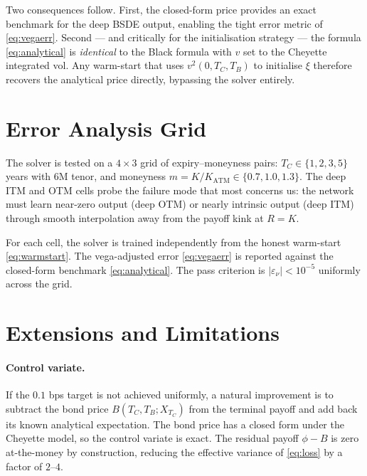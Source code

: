 \documentclass[11pt,a4paper]{article}
\begin{document}
Two consequences follow. First, the closed-form price provides an exact
benchmark for the deep BSDE output, enabling the tight error metric of
\eqref{eq:vegaerr}. Second — and critically for the initialisation strategy
— the formula \eqref{eq:analytical} is \emph{identical} to the Black formula
with $v$ set to the Cheyette integrated vol. Any warm-start that uses
$v^2(0, T_C, T_B)$ to initialise $\xi$ therefore recovers the analytical
price directly, bypassing the solver entirely.

\section{Error Analysis Grid}
\label{sec:grid}

The solver is tested on a $4 \times 3$ grid of expiry--moneyness pairs:
$T_C \in \{1, 2, 3, 5\}$ years with 6M tenor, and moneyness
$m = K / K_{\mathrm{ATM}} \in \{0.7, 1.0, 1.3\}$. The deep ITM and OTM cells
probe the failure mode that most concerns us: the network must learn near-zero
output (deep OTM) or nearly intrinsic output (deep ITM) through smooth
interpolation away from the payoff kink at $R = K$.

For each cell, the solver is trained independently from the honest warm-start
\eqref{eq:warmstart}. The vega-adjusted error \eqref{eq:vegaerr} is reported
against the closed-form benchmark \eqref{eq:analytical}. The pass criterion
is $|\varepsilon_\nu| < 10^{-5}$ uniformly across the grid.

\section{Extensions and Limitations}
\label{sec:extensions}

\paragraph{Control variate.}
If the $0.1$ bps target is not achieved uniformly, a natural improvement is
to subtract the bond price $B(T_C, T_B; X_{T_C})$ from the terminal payoff
and add back its known analytical expectation. The bond price has a closed
form under the Cheyette model, so the control variate is exact. The residual
payoff $\phi - B$ is zero at-the-money by construction, reducing the
effective variance of \eqref{eq:loss} by a factor of $2$--$4$.
\end{document}
